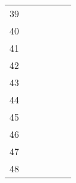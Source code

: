 \begin{table}[ht]
\begin{tabular}{c|lllll}
    39                       &                                          &                                           &                                                &                                    &                                      \\
    40                       &                                          &                                           &                                                &                                    &                                      \\
    41                       &                                          &                                           &                                                &                                    &                                      \\
    42                       &                                          &                                           &                                                &                                    &                                      \\
    43                       &                                          &                                           &                                                &                                    &                                      \\
    44                       &                                          &                                           &                                                &                                    &                                      \\
    45                       &                                          &                                           &                                                &                                    &                                      \\
    46                       &                                          &                                           &                                                &                                    &                                      \\
    47                       &                                          &                                           &                                                &                                    &                                      \\
    48                       &                                          &                                           &                                                &                                    &                                      \\

\end{tabular}
\end{table}
